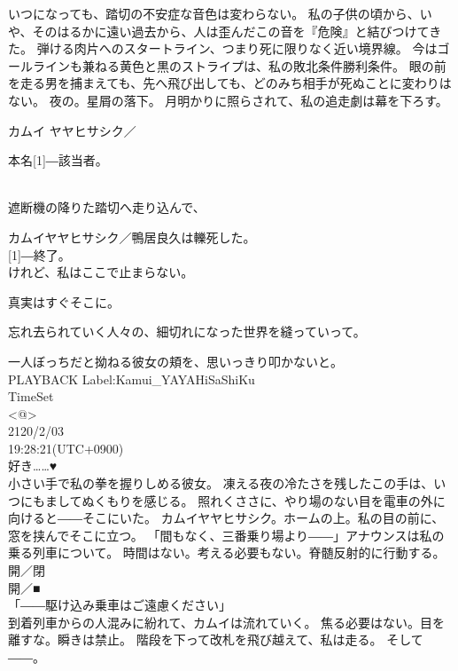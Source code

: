 \documentclass[../NenokuniMain]{subfiles}
\begin{document}
いつになっても、踏切の不安症な音色は変わらない。
私の子供の頃から、いや、そのはるかに遠い過去から、人は歪んだこの音を『危険』と結びつけてきた。
弾ける肉片へのスタートライン、つまり死に限りなく近い境界線。
今はゴールラインも兼ねる黄色と黒のストライプは、私の敗北条件勝利条件。
眼の前を走る男を捕まえても、先へ飛び出しても、どのみち相手が死ぬことに変わりはない。
夜の。星屑の落下。
月明かりに照らされて、私の追走劇は幕を下ろす。

カムイ ヤヤヒサシク／

本名\scalebox{2}[1]{―}該当者。

　\\

遮断機の降りた踏切へ走り込んで、

カムイヤヤヒサシク／鴨居良久は轢死した。\\

\scalebox{2}[1]{―}終了。\\

けれど、私はここで止まらない。

真実はすぐそこに。

忘れ去られていく人々の、細切れになった世界を縫っていって。

一人ぼっちだと拗ねる彼女の頬を、思いっきり叩かないと。\\

PLAYBACK Label:Kamui\_YAYAHiSaShiKu\\
          TimeSet\\
            <@>\\
         2120/2/03\\
     19:28:21(UTC+0900)\\

好き……♥\\

小さい手で私の拳を握りしめる彼女。
凍える夜の冷たさを残したこの手は、いつにもましてぬくもりを感じる。
照れくささに、やり場のない目を電車の外に向けると――そこにいた。
カムイヤヤヒサシク。ホームの上。私の目の前に、窓を挟んでそこに立つ。
「間もなく、三番乗り場より――」アナウンスは私の乗る列車について。
時間はない。考える必要もない。脊髄反射的に行動する。\\
                開／閉\\
                開／■\\
「――駆け込み乗車はご遠慮ください」\\
到着列車からの人混みに紛れて、カムイは流れていく。
焦る必要はない。目を離すな。瞬きは禁止。
階段を下って改札を飛び越えて、私は走る。
そして――。
\end{document}

